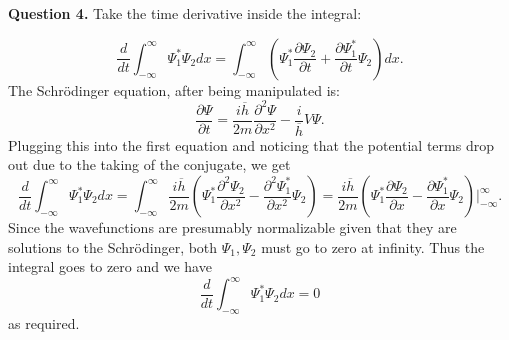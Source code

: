 \documentclass[letterpaper, reqno,11pt]{article}
\begin{document}
{\noindent\bf Question 4.} Take the time derivative inside the integral: 

\[
\frac{d}{dt}\int_{-\infty}^{\infty}\Psi_1^*\Psi_2 dx=\int_{-\infty}^{\infty}\left(\Psi_1^* \frac{\partial \Psi_2}{\partial t} + \frac{\partial \Psi_1^*}{\partial t} \Psi_2\right) dx
.\]
The Schr\"odinger equation, after being manipulated is:
\[
\frac{\partial \Psi}{\partial t} =\frac{i\overline{h}}{2m} \frac{\partial^2\Psi}{\partial x^2} -\frac{i}{\overline{h}}V\Psi
.\]
Plugging this into the first equation and noticing that the potential terms drop out due to the taking of the conjugate, we get 
\[
\frac{d}{dt}\int_{-\infty}^{\infty}\Psi_1^*\Psi_2 dx=\int_{-\infty}^{\infty}\frac{i\overline{h}}{2m}\left( \Psi_1^* \frac{\partial^2\Psi_2}{\partial x^2}-\frac{\partial ^2\Psi_1^*}{\partial x^2}\Psi_2 \right)=\frac{i\overline{h}}{2m}\left( \Psi_1^*\frac{\partial\Psi_2}{\partial x}-\frac{\partial \Psi_1^*}{\partial x}\Psi_2 \right) \bigg|_{-\infty}^\infty
.\]
Since the wavefunctions are presumably normalizable given that they are solutions to the Schr\"odinger, both $\Psi_1, \Psi_2$ must go to zero at infinity. Thus the integral goes to zero and we have 
\[
\frac{d}{dt}\int_{-\infty}^{\infty}\Psi_1^*\Psi_2 dx=0
\]
as required. 
\end{document}
